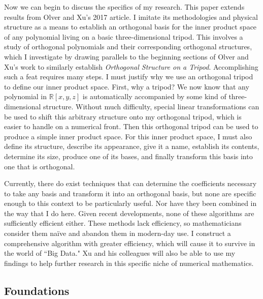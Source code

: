 \documentclass[letterpaper, 12pt]{article}
\begin{document}
Now we can begin to discuss the specifics of my research. This paper extends results from Olver and Xu's 2017 article. I imitate its methodologies and physical structure as a means to establish an orthogonal basis for the inner product space of any polynomial living on a basic three-dimensional tripod. This involves a study of orthogonal polynomials and their corresponding orthogonal structures, which I investigate by drawing parallels to the beginning sections of Olver and Xu's work to similarly establish \textit{Orthogonal Structure on a Tripod}. Accomplishing such a feat requires many steps. I must justify why we use an orthogonal tripod to define our inner product space. First, why a tripod? We now know that any polynomial in $\mathbb{R}[x, y, z]$ is automatically accompanied by some kind of three-dimensional structure. Without much difficulty, special linear transformations can be used to shift this arbitrary structure onto my orthogonal tripod, which is easier to handle on a numerical front. Then this orthogonal tripod can be used to produce a simple inner product space. For this inner product space, I must also define its structure, describe its appearance, give it a name, establish its contents, determine its size, produce one of its bases, and finally transform this basis into one that is orthogonal.

Currently, there do exist techniques that can determine the coefficients necessary to take any basis and transform it into an orthogonal basis, but none are specific enough to this context to be particularly useful. Nor have they been combined in the way that I do here. Given recent developments, none of these algorithms are sufficiently efficient either. These methods lack efficiency, so mathematicians consider them na\"ive and abandon them in modern-day use. I construct a comprehensive algorithm with greater efficiency, which will cause it to survive in the world of ``Big Data." Xu and his colleagues will also be able to use my findings to help further research in this specific niche of numerical mathematics.







\newpage
\begin{centering}\section{Foundations}\end{centering}
\end{document}
